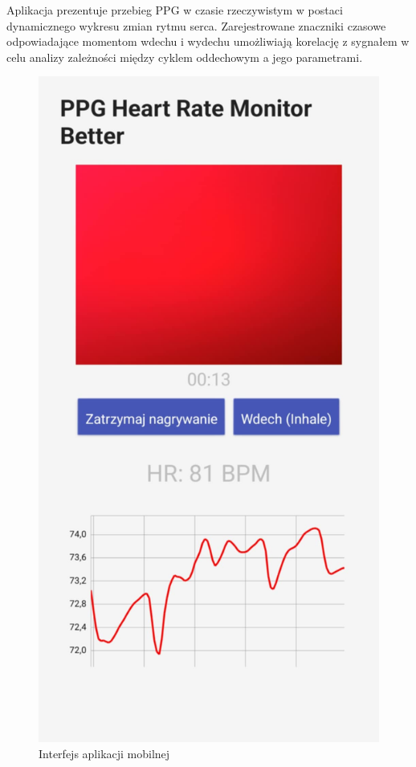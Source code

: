 \documentclass[journal]{IEEEtran}
\begin{document}
Aplikacja prezentuje przebieg PPG w czasie rzeczywistym w postaci dynamicznego wykresu zmian rytmu serca. Zarejestrowane znaczniki czasowe odpowiadające momentom wdechu i wydechu umożliwiają korelację z sygnałem w celu analizy zależności między cyklem oddechowym a jego parametrami.

\begin{figure}[htbp]
    \centering
    \includegraphics[scale=0.17]{aplikacja.png}
    \caption{Interfejs aplikacji mobilnej}
    \label{fig:aplikacja_mobilna}
\end{figure}
\end{document}
